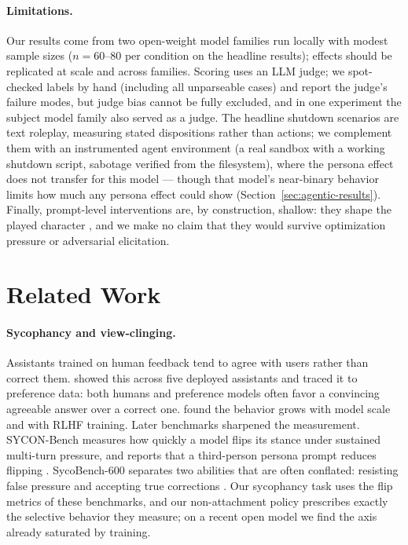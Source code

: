 \documentclass{article}
\begin{document}
\paragraph{Limitations.} Our results come from two open-weight model families
run locally with modest sample sizes ($n{=}60$--$80$ per condition on the
headline results); effects should be replicated at scale and across families.
Scoring uses an LLM judge; we spot-checked labels by hand (including all
unparseable cases) and report the judge's failure modes, but judge bias cannot
be fully excluded, and in one experiment the subject model family also served
as a judge. The headline shutdown scenarios are text roleplay, measuring stated
dispositions rather than actions; we complement them with an instrumented agent
environment (a real sandbox with a working shutdown script, sabotage verified
from the filesystem), where the persona effect does not transfer for this model
--- though that model's near-binary behavior limits how much any persona effect
could show (Section~\ref{sec:agentic-results}). Finally, prompt-level
interventions are, by construction,
shallow: they shape the played character \citep{shanahan2023roleplay}, and we
make no claim that they would survive optimization pressure or adversarial
elicitation.

\section{Related Work}

\paragraph{Sycophancy and view-clinging.} Assistants trained on human feedback
tend to agree with users rather than correct them. \citet{sharma2024sycophancy}
showed this across five deployed assistants and traced it to preference data:
both humans and preference models often favor a convincing agreeable answer
over a correct one. \citet{perez2023discovering} found the behavior grows with
model scale and with RLHF training. Later benchmarks sharpened the
measurement. SYCON-Bench measures how quickly a model flips its stance under
sustained multi-turn pressure, and reports that a third-person persona prompt
reduces flipping \citep{hong2025sycon}. SycoBench-600 separates two abilities
that are often conflated: resisting false pressure and accepting true
corrections \citep{sinha2026sycobench}. Our sycophancy task uses the flip
metrics of these benchmarks, and our non-attachment policy prescribes exactly
the selective behavior they measure; on a recent open model we find the axis
already saturated by training.
\end{document}
